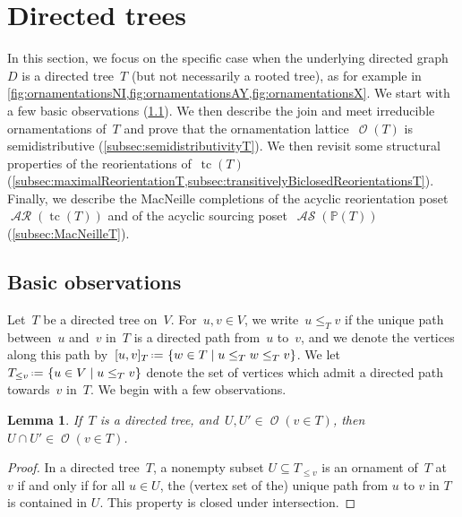 \documentclass{amsart}
\newtheorem{lemma}[theorem]{Lemma}
\theoremstyle{definition}
\renewcommand{\c}[1]{\mathcal{#1}} %
\newcommand{\set}[2]{\left\{ #1 \;\middle|\; #2 \right\}} %
\newcommand{\eqdef}{\mbox{\,\raisebox{0.2ex}{\scriptsize\ensuremath{\mathrm:}}\ensuremath{=}\,}} %
\DeclareMathOperator{\tc}{tc} %
\newcommand{\lessin}[2]{#1_{\le#2}} %
\DeclareMathOperator{\Orn}{\c{O}}  %
\DeclareMathOperator{\AReori}{\c{AR}}  %
\DeclareMathOperator{\ASour}{\mathcal{AS}}  %
\newcommand{\PP}{\mathbb P} %
\begin{document}

\section{Directed trees}
\label{sec:trees}

In this section, we focus on the specific case when the underlying directed graph~$D$ is a directed tree~$T$ (but not necessarily a rooted tree), as for example in \cref{fig:ornamentationsNI,fig:ornamentationsAY,fig:ornamentationsX}.
We start with a few basic observations (\cref{subsec:basicObservationsT}).
We then describe the join and meet irreducible ornamentations of~$T$ and prove that the ornamentation lattice~$\Orn(T)$ is semidistributive (\cref{subsec:semidistributivityT}).
We then revisit some structural properties of the reorientations of~$\tc(T)$ (\cref{subsec:maximalReorientationT,subsec:transitivelyBiclosedReorientationsT}).
Finally, we describe the MacNeille completions of the acyclic reorientation poset~$\AReori(\tc(T))$ and of the acyclic sourcing poset~$\ASour(\PP(T))$ (\cref{subsec:MacNeilleT}).



\subsection{Basic observations}
\label{subsec:basicObservationsT}

Let~$T$ be a directed tree on~$V$.
For~$u,v \in V$, we write~$u \le_T v$ if the unique path between~$u$ and~$v$ in~$T$ is a directed path from~$u$ to~$v$, and we denote the vertices along this path by~$[u,v]_T \eqdef \set{w \in T}{u \le_T w \le_T v}$.
We let~$\lessin{T}{v} \eqdef \set{u \in V}{u \le_T v}$ denote the set of vertices which admit a directed path towards~$v$ in~$T$.
We begin with a few observations.

\begin{lemma}
\label{lem:meetOrnT}
If~$T$ is a directed tree, and~$U,U' \in \Orn(v \in T)$, then~$U \cap U' \in \Orn(v \in T)$.
\end{lemma}

\begin{proof}
In a directed tree~$T$, a nonempty subset $U \subseteq \lessin{T}{v}$ is an ornament of~$T$ at~$v$ if and only if for all $u \in U$, the (vertex set of the) unique path from $u$ to $v$ in $T$ is contained in $U$.
This property is closed under intersection.
\end{proof}
\end{document}
